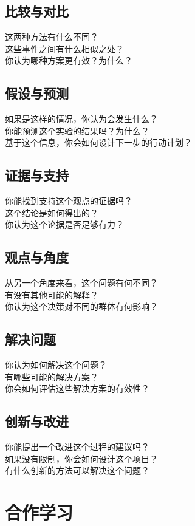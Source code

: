 \documentclass[12pt]{book}
\begin{document}
\subsection{比较与对比}
这两种方法有什么不同？\\
这些事件之间有什么相似之处？\\
你认为哪种方案更有效？为什么？\\
\subsection{假设与预测}
如果是这样的情况，你认为会发生什么？\\
你能预测这个实验的结果吗？为什么？\\
基于这个信息，你会如何设计下一步的行动计划？\\
\subsection{证据与支持}
你能找到支持这个观点的证据吗？\\
这个结论是如何得出的？\\
你认为这个论据是否足够有力？\\
\subsection{观点与角度}
从另一个角度来看，这个问题有何不同？\\
有没有其他可能的解释？\\
你认为这个决策对不同的群体有何影响？\\

\subsection{解决问题}
你认为如何解决这个问题？\\
有哪些可能的解决方案？\\
你会如何评估这些解决方案的有效性？\\

\subsection{创新与改进}
你能提出一个改进这个过程的建议吗？\\
如果没有限制，你会如何设计这个项目？\\
有什么创新的方法可以解决这个问题？\\


\section{合作学习}
\end{document}
